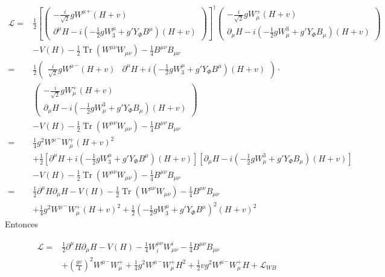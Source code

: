 \begin{align}
  \mathcal{L}=&\frac{1}{2}\left[\begin{pmatrix}
    -\frac{i}{\sqrt{2}}g{W^\mu}^+(H+v)\\
    \partial^\mu H-i\left(-\frac{1}{2}gW_3^\mu+g'Y_\Phi B^\mu\right)(H+v)
  \end{pmatrix}\right]^\dagger\begin{pmatrix}
    -\frac{i}{\sqrt{2}}gW_\mu^+(H+v)\\
    \partial_\mu H-i\left(-\frac{1}{2}gW^3_\mu+g'Y_\Phi B_\mu\right)(H+v)
  \end{pmatrix}\nonumber\\
  &-V(H)-\tfrac{1}{2}\operatorname{Tr}\left(W^{\mu\nu}W_{\mu\nu}\right)-\tfrac{1}{4}B^{\mu\nu}B_{\mu\nu}\nonumber\\
=&\frac{1}{2}\begin{pmatrix}
    \frac{i}{\sqrt{2}}g{W^\mu}^-(H+v)&
    \partial^\mu H+i\left(-\frac{1}{2}gW_3^\mu+g'Y_\Phi B^\mu\right)(H+v)
  \end{pmatrix}\cdot\nonumber\\
  &\begin{pmatrix}
    -\frac{i}{\sqrt{2}}gW_\mu^+(H+v)\\
    \partial_\mu H-i\left(-\frac{1}{2}gW^3_\mu+g'Y_\Phi B_\mu\right)(H+v)
  \end{pmatrix}\nonumber\\
  &-V(H)-\tfrac{1}{2}\operatorname{Tr}\left(W^{\mu\nu}W_{\mu\nu}\right)-\tfrac{1}{4}B^{\mu\nu}B_{\mu\nu}\nonumber\\
  =&\frac{1}{4}g^2{W^\mu}^-W_\mu^+(H+v)^2\nonumber\\
  &+\frac{1}{2}\left[\partial^\mu H+i\left(-\tfrac{1}{2}gW_3^\mu+g'Y_\Phi B^\mu\right)(H+v)\right]\left[\partial_\mu H-i\left(-\tfrac{1}{2}gW^3_\mu+g'Y_\Phi B_\mu\right)(H+v)\right]\nonumber\\
  &-V(H)-\tfrac{1}{2}\operatorname{Tr}\left(W^{\mu\nu}W_{\mu\nu}\right)-\tfrac{1}{4}B^{\mu\nu}B_{\mu\nu}\nonumber\\
 =&\frac{1}{2}\partial^\mu H\partial_\mu H-V(H)-\tfrac{1}{2}\operatorname{Tr}\left(W^{\mu\nu}W_{\mu\nu}\right)-\tfrac{1}{4}B^{\mu\nu}B_{\mu\nu}\nonumber\\
  &+\frac{1}{4}g^2{W^\mu}^-W_\mu^+(H+v)^2+\frac{1}{2}\left(-\tfrac{1}{2}gW_3^\mu+g'Y_\Phi B^\mu\right)^2(H+v)^2
\end{align}
Entonces

\begin{align}
  \mathcal{L}=&\frac{1}{2}\partial^\mu H\partial_\mu H-V(H)-\tfrac{1}{4}W^{\mu\nu}_iW_{\mu\nu}^i-\tfrac{1}{4}B^{\mu\nu}B_{\mu\nu}\nonumber\\
  \label{eq:96}
  &+\left(\frac{gv}{4}\right)^2{W^\mu}^-W_\mu^++\frac{1}{4}g^2{W^\mu}^-W_\mu^+H^2+\frac{1}{2}vg^2{W^\mu}^-W_\mu^+H+\mathcal{L}_{WB}
\end{align}

